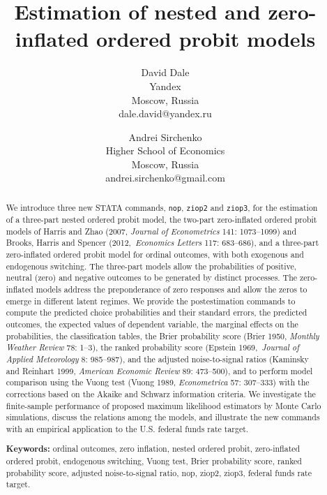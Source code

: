 \documentclass[letterpaper,fleqn,12pt]{article}
\begin{document}
\title{Estimation of nested and zero-inflated ordered probit models\\
\bigskip }
\date{}
\author{David Dale \\
Yandex\\
Moscow, Russia\\
dale.david@yandex.ru \and Andrei Sirchenko \\
Higher School of Economics\\
Moscow, Russia\\
andrei.sirchenko@gmail.com}
\maketitle

\begin{abstract}
We introduce three new STATA commands, \texttt{nop}, \texttt{ziop2} and 
\texttt{ziop3}, for the estimation of a three-part nested ordered probit
model, the two-part zero-inflated ordered probit models of Harris and Zhao
(2007, \textit{Journal of Econometrics }141: 1073--1099) and Brooks, Harris
and Spencer (2012,\ \textit{Economics Letters} 117: 683--686), and a
three-part zero-inflated ordered probit model for ordinal outcomes, with
both exogenous and endogenous switching. The three-part models allow the
probabilities of positive, neutral (zero) and negative outcomes to be
generated by distinct processes. The zero-inflated models address the
preponderance of zero responses and allow the zeros to emerge in different
latent regimes. We provide the postestimation commands to compute the
predicted choice probabilities and their standard errors, the predicted
outcomes, the expected values of dependent variable, the marginal effects on
the probabilities, the classification tables, the Brier probability score
(Brier 1950, \textit{Monthly Weather Review} 78: 1--3), the ranked
probability score (Epstein 1969,\ \textit{Journal of Applied Meteorology} 8:
985--987), and the adjusted noise-to-signal ratios (Kaminsky and Reinhart
1999, \textit{American Economic Review} 89: 473--500), and to perform model
comparison using the Vuong test (Vuong 1989, \textit{Econometrica} 57:
307--333) with the corrections based on the Akaike and Schwarz information
criteria. We investigate the finite-sample performance of proposed maximum
likelihood estimators by Monte Carlo simulations, discuss the relations
among the models, and illustrate the new commands with an empirical
application to the U.S. federal funds rate target.

\bigskip \bigskip \bigskip \bigskip

\bigskip \bigskip \bigskip \bigskip

\bigskip \bigskip \bigskip \bigskip \bigskip \bigskip \bigskip

\textbf{Keywords:} ordinal outcomes, zero inflation, nested ordered probit,
zero-inflated ordered probit, endogenous switching, Vuong test, Brier
probability score, ranked probability score, adjusted noise-to-signal ratio,
nop, ziop2, ziop3, federal funds rate target.

\bigskip \bigskip \bigskip \bigskip \bigskip
\end{abstract}
\end{document}
